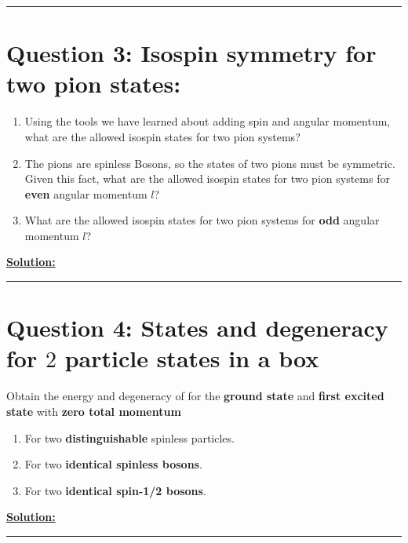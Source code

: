\documentclass{article}
\begin{document}
\vskip 0.5cm 
\hrule 
\vskip 0.5cm


\section*{Question 3: Isospin symmetry for two pion states:}
\begin{enumerate}[label=(\alph*)]
  \item Using the tools we have learned about adding spin and angular momentum, what are the allowed isospin states for two pion systems?
  \item The pions are spinless Bosons, so the states of two pions must be symmetric. Given this fact, what are the allowed isospin states for two pion systems for \textbf{even} angular momentum $l$?
  \item What are the allowed isospin states for two pion systems for \textbf{odd} angular momentum $l$?
\end{enumerate} 

\vskip 0.5cm
\underline{\textbf{Solution:}} 


\vskip 0.5cm 
\hrule 
\vskip 0.5cm


\section*{Question 4: States and degeneracy for $2$ particle states in a box} 
Obtain the energy and degeneracy of for the \textbf{ground state} and \textbf{first excited state} with \textbf{zero total momentum}
\begin{enumerate}[label=(\alph*)]
  \item For two \textbf{distinguishable} spinless particles.
  \item For two \textbf{identical spinless bosons}.
  \item For two \textbf{identical spin-1/2 bosons}.
\end{enumerate}

\vskip 0.5cm
\underline{\textbf{Solution:}} 


\vskip 0.5cm 
\hrule 
\vskip 0.5cm


\end{document}
